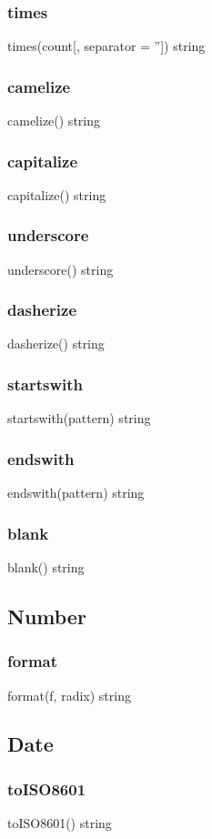 {{{{{{{{\subsubsection*{times}
times(count[, separator = '']) \rightarrow string
\subsubsection*{camelize}
camelize() \rightarrow string
\subsubsection*{capitalize}
capitalize() \rightarrow string
\subsubsection*{underscore}
underscore() \rightarrow string
\subsubsection*{dasherize}
dasherize() \rightarrow string
\subsubsection*{startswith}
startswith(pattern) \rightarrow string
\subsubsection*{endswith}
endswith(pattern) \rightarrow string
\subsubsection*{blank}
blank() \rightarrow string

\subsection{Number}
\subsubsection*{format}
format(f, radix) \rightarrow string

\subsection{Date}
\subsubsection*{toISO8601}
toISO8601() \rightarrow string

}}}}}}}}
